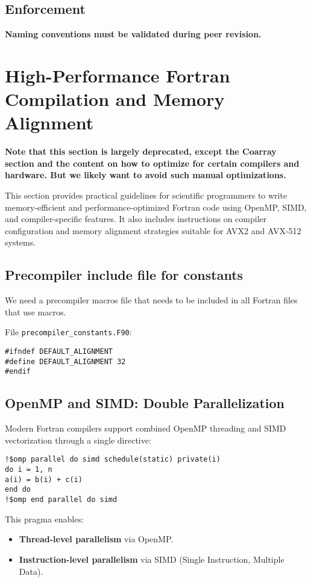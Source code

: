 \documentclass{article}
\begin{document}
\subsection{Enforcement}
\textbf{Naming conventions must be validated during peer revision.}

\section{High-Performance Fortran Compilation and Memory Alignment}

\textbf{Note that this section is largely deprecated, except the Coarray
section and the content on how to optimize for certain compilers and hardware.
But we likely want to avoid such manual optimizations.}

This section provides practical guidelines for scientific programmers to write memory-efficient and performance-optimized Fortran code using OpenMP, SIMD, and compiler-specific features. It also includes instructions on compiler configuration and memory alignment strategies suitable for AVX2 and AVX-512 systems.

\subsection{Precompiler include file for constants}

We need a precompiler macros file that needs to be included in all Fortran
files that use macros.

\vspace{1em}%
\noindent{}File \texttt{precompiler\_constants.F90}:
\begin{verbatim}
#ifndef DEFAULT_ALIGNMENT
#define DEFAULT_ALIGNMENT 32
#endif
\end{verbatim}

\subsection{OpenMP and SIMD: Double Parallelization}
\label{thread_and_vectorized_parallelization}
Modern Fortran compilers support combined OpenMP threading and SIMD vectorization through a single directive:

\begin{verbatim}
!$omp parallel do simd schedule(static) private(i)
do i = 1, n
a(i) = b(i) + c(i)
end do
!$omp end parallel do simd
\end{verbatim}

This pragma enables:
\begin{itemize}
\item \textbf{Thread-level parallelism} via OpenMP.
\item \textbf{Instruction-level parallelism} via SIMD (Single Instruction, Multiple Data).
\end{itemize}
\end{document}
